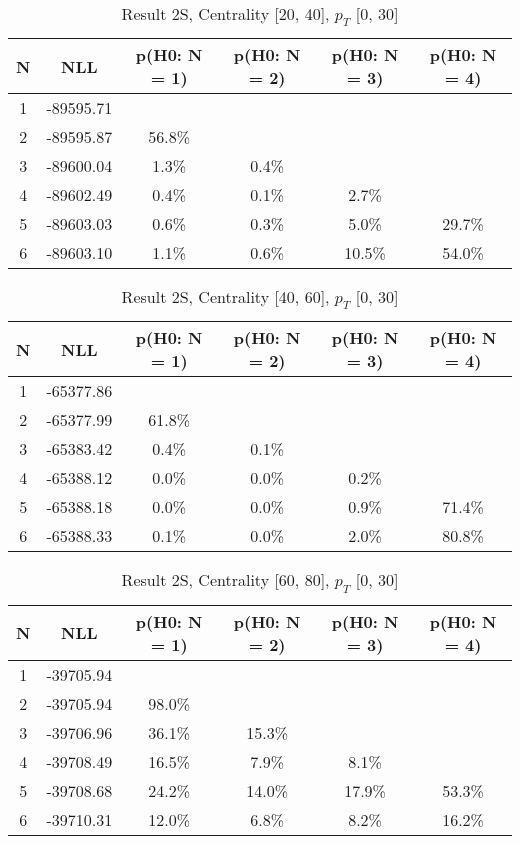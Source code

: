 \begin{table}[htb]
	\begin{center}
	\caption{Result 2S, Centrality [20, 40], $p_{T}$ [0, 30]
}
{\footnotesize\renewcommand{\arraystretch}{1.4}
		\begin{tabular}{cc||cccc}
			N & NLL & p(H0: N = 1) & p(H0: N = 2) & p(H0: N = 3) & p(H0: N = 4)\\ 
		\hline
1 & -89595.71 & & & & \\
2 & -89595.87 & 56.8\% & & & \\
3 & -89600.04 & 1.3\% & 0.4\% & & \\
4 & -89602.49 & 0.4\% & 0.1\% & 2.7\% & \\
5 & -89603.03 & 0.6\% & 0.3\% & 5.0\% & 29.7\% \\
6 & -89603.10 & 1.1\% & 0.6\% & 10.5\% & 54.0\% \\
	\end{tabular}
		\label{tab:lab}
	}
	\end{center}\end{table}

\begin{table}[htb]
	\begin{center}
	\caption{Result 2S, Centrality [40, 60], $p_{T}$ [0, 30]
}
{\footnotesize\renewcommand{\arraystretch}{1.4}
		\begin{tabular}{cc||cccc}
			N & NLL & p(H0: N = 1) & p(H0: N = 2) & p(H0: N = 3) & p(H0: N = 4)\\ 
		\hline
1 & -65377.86 & & & & \\
2 & -65377.99 & 61.8\% & & & \\
3 & -65383.42 & 0.4\% & 0.1\% & & \\
4 & -65388.12 & 0.0\% & 0.0\% & 0.2\% & \\
5 & -65388.18 & 0.0\% & 0.0\% & 0.9\% & 71.4\% \\
6 & -65388.33 & 0.1\% & 0.0\% & 2.0\% & 80.8\% \\
	\end{tabular}
		\label{tab:lab}
	}
	\end{center}\end{table}

\begin{table}[htb]
	\begin{center}
	\caption{Result 2S, Centrality [60, 80], $p_{T}$ [0, 30]
}
{\footnotesize\renewcommand{\arraystretch}{1.4}
		\begin{tabular}{cc||cccc}
			N & NLL & p(H0: N = 1) & p(H0: N = 2) & p(H0: N = 3) & p(H0: N = 4)\\ 
		\hline
1 & -39705.94 & & & & \\
2 & -39705.94 & 98.0\% & & & \\
3 & -39706.96 & 36.1\% & 15.3\% & & \\
4 & -39708.49 & 16.5\% & 7.9\% & 8.1\% & \\
5 & -39708.68 & 24.2\% & 14.0\% & 17.9\% & 53.3\% \\
6 & -39710.31 & 12.0\% & 6.8\% & 8.2\% & 16.2\% \\
	\end{tabular}
		\label{tab:lab}
	}
	\end{center}\end{table}


